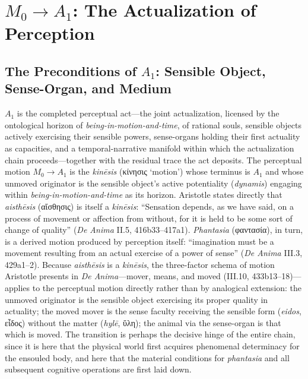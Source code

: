 \documentclass{article}
\newcommand{\gk}[1]{{\greekfont #1}}
\begin{document}
\section{$M_0 \rightarrow A_1$: The Actualization of Perception}

\subsection{The Preconditions of $A_1$: Sensible Object, Sense-Organ, and Medium}

$A_1$ is the completed perceptual act---the joint actualization, licensed by the ontological horizon of \textit{being-in-motion-and-time}, of rational souls, sensible objects actively exercising their sensible powers, sense-organs holding their first actuality as capacities, and a temporal-narrative manifold within which the actualization chain proceeds---together with the residual trace the act deposits. The perceptual motion $M_0 \rightarrow A_1$ is the \textit{kinēsis} (\gk{κίνησις} `motion') whose terminus is $A_1$ and whose unmoved originator is the sensible object's active potentiality (\textit{dynamis}) engaging within \textit{being-in-motion-and-time} as its horizon. Aristotle states directly that \textit{aisthēsis} (\gk{αἴσθησις}) is itself a \textit{kinēsis}: ``Sensation depends, as we have said, on a process of movement or affection from without, for it is held to be some sort of change of quality'' (\textit{De Anima} II.5, 416b33--417a1). \textit{Phantasia} (\gk{φαντασία}), in turn, is a derived motion produced by perception itself: ``imagination must be a movement resulting from an actual exercise of a power of sense'' (\textit{De Anima} III.3, 429a1--2). Because \textit{aisthēsis} is a \textit{kinēsis}, the three-factor schema of motion Aristotle presents in \textit{De Anima}---mover, means, and moved (III.10, 433b13--18)---applies to the perceptual motion directly rather than by analogical extension: the unmoved originator is the sensible object exercising its proper quality in actuality; the moved mover is the sense faculty receiving the sensible form (\textit{eidos}, \gk{εἶδος}) without the matter (\textit{hylē}, \gk{ὕλη}); the animal via the sense-organ is that which is moved. The transition is perhaps the decisive hinge of the entire chain, since it is here that the physical world first acquires phenomenal determinacy for the ensouled body, and here that the material conditions for \textit{phantasia} and all subsequent cognitive operations are first laid down.
\end{document}
